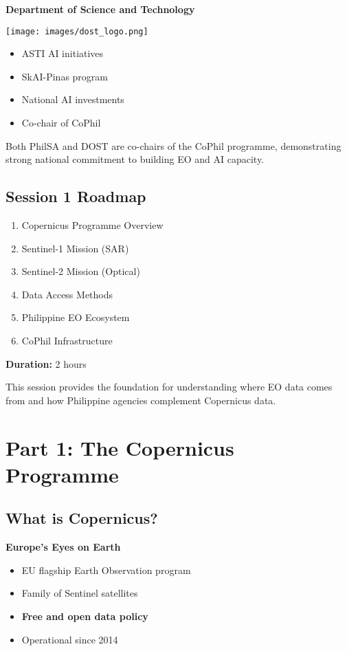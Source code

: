 \documentclass[
  letterpaper,
  DIV=11,
  numbers=noendperiod]{scrartcl}
\providecommand{\tightlist}{%
  \setlength{\itemsep}{0pt}\setlength{\parskip}{0pt}}
\begin{document}
\textbf{Department of Science and Technology}

\texttt{[image: images/dost\_logo.png]}

\begin{itemize}
\tightlist
\item
  ASTI AI initiatives
\item
  SkAI-Pinas program
\item
  National AI investments
\item
  Co-chair of CoPhil
\end{itemize}

Both PhilSA and DOST are co-chairs of the CoPhil programme,
demonstrating strong national commitment to building EO and AI capacity.

\subsection{Session 1 Roadmap}\label{session-1-roadmap}

\begin{enumerate}
\def\labelenumi{\arabic{enumi}.}
\tightlist
\item
  Copernicus Programme Overview
\item
  Sentinel-1 Mission (SAR)
\item
  Sentinel-2 Mission (Optical)
\item
  Data Access Methods
\item
  Philippine EO Ecosystem
\item
  CoPhil Infrastructure
\end{enumerate}

\textbf{Duration:} 2 hours

This session provides the foundation for understanding where EO data
comes from and how Philippine agencies complement Copernicus data.

\section{Part 1: The Copernicus
Programme}\label{part-1-the-copernicus-programme}

\subsection{What is Copernicus?}\label{what-is-copernicus}

\textbf{Europe's Eyes on Earth}

\begin{itemize}
\tightlist
\item
  EU flagship Earth Observation program
\item
  Family of Sentinel satellites
\item
  \textbf{Free and open data policy}
\item
  Operational since 2014
\end{itemize}
\end{document}

